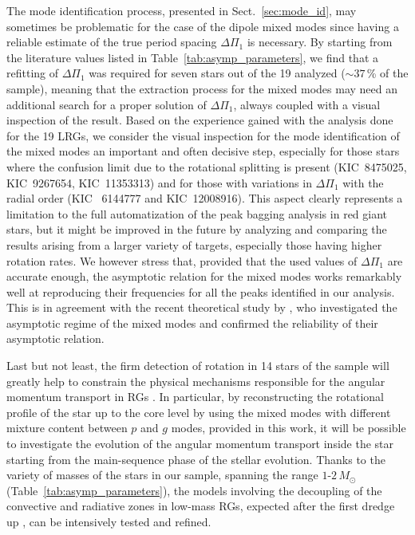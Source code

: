 \documentclass[structabstract]{aa}
\newcommand{\DP}{\Delta\Pi_1}
\newcommand{\kic}{KIC~12008916}
\begin{document}
The mode identification process, presented in Sect.~\ref{sec:mode_id}, may sometimes be problematic for the case of the dipole mixed modes since having a reliable estimate of the true period spacing $\DP$ is necessary. By starting from the literature values listed in Table~\ref{tab:asymp_parameters}, we find that a refitting of $\DP$ was required for seven stars out of the 19 analyzed ($\sim37$\,\% of the sample), meaning that the extraction process for the mixed modes may need an additional search for a proper solution of $\DP$, always coupled with a visual inspection of the result. Based on the experience gained with the analysis done for the 19 LRGs, we consider the visual inspection for the mode identification of the mixed modes an important and often decisive step, especially for those stars where the confusion limit due to the rotational splitting is present (KIC~8475025, KIC~9267654, KIC~11353313) and for those with variations in $\DP$ with the radial order (KIC~ 6144777 and \kic). This aspect clearly represents a limitation to the full automatization of the peak bagging analysis in red giant stars, but it might be improved in the future by analyzing and comparing the results arising from a larger variety of targets, especially those having higher rotation rates. We however stress that, provided that the used values of $\DP$ are accurate enough, the asymptotic relation for the mixed modes works remarkably well at reproducing their frequencies for all the peaks identified in our analysis. This is in agreement with the recent theoretical study by \cite{Jiang14}, who investigated the asymptotic regime of the mixed modes and confirmed the reliability of their asymptotic relation.

Last but not least, the firm detection of rotation in 14 stars of the sample will greatly help to constrain the physical mechanisms responsible for the angular momentum transport in RGs \citep[e.g.][and references therein]{Tayar13}. In particular, by reconstructing the rotational profile of the star up to the core level by using the mixed modes with different mixture content between $p$ and $g$ modes, provided in this work, it will be possible to investigate the evolution of the angular momentum transport inside the star starting from the main-sequence phase of the stellar evolution. Thanks to the variety of masses of the stars in our sample, spanning the range $1$-$2$\,$M_\odot$ (Table~\ref{tab:asymp_parameters}), the models involving the decoupling of the convective and radiative zones in low-mass RGs, expected after the first dredge up \citep{Tayar13}, can be intensively tested and refined.
\end{document}

